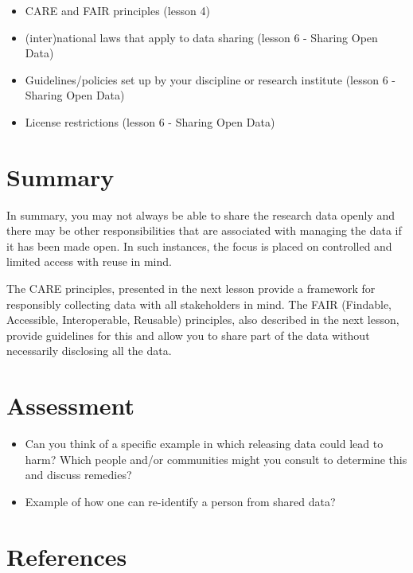 \documentclass[
  letterpaper,
  DIV=11,
  numbers=noendperiod]{scrreport}
\providecommand{\tightlist}{%
  \setlength{\itemsep}{0pt}\setlength{\parskip}{0pt}}\usepackage{longtable,booktabs,array}
\begin{document}
\begin{itemize}
\tightlist
\item
  CARE and FAIR principles (lesson 4)
\item
  (inter)national laws that apply to data sharing (lesson 6 - Sharing
  Open Data)
\item
  Guidelines/policies set up by your discipline or research institute
  (lesson 6 - Sharing Open Data)
\item
  License restrictions (lesson 6 - Sharing Open Data)
\end{itemize}

\hypertarget{summary-11}{%
\section{Summary}\label{summary-11}}

In summary, you may not always be able to share the research data openly
and there may be other responsibilities that are associated with
managing the data if it has been made open. In such instances, the focus
is placed on controlled and limited access with reuse in mind.

The CARE principles, presented in the next lesson provide a framework
for responsibly collecting data with all stakeholders in mind. The FAIR
(Findable, Accessible, Interoperable, Reusable) principles, also
described in the next lesson, provide guidelines for this and allow you
to share part of the data without necessarily disclosing all the data.

\hypertarget{assessment-2}{%
\section{Assessment}\label{assessment-2}}

\begin{itemize}
\item
  Can you think of a specific example in which releasing data could lead
  to harm? Which people and/or communities might you consult to
  determine this and discuss remedies?
\item
  Example of how one can re-identify a person from shared data?
\end{itemize}

\hypertarget{references-4}{%
\section{References}\label{references-4}}
\end{document}
